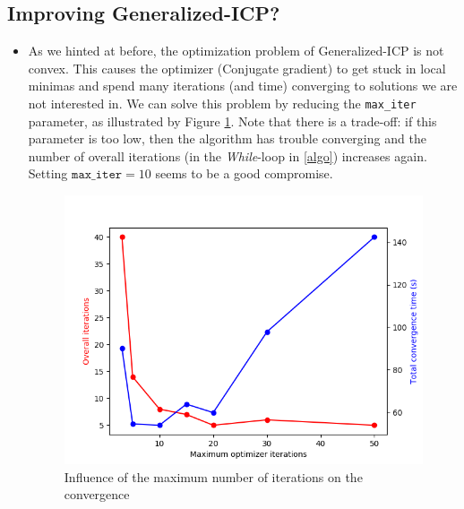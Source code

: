 \documentclass[11pt,letterpaper,leqno]{article}
\begin{document}
\subsection{Improving Generalized-ICP?}
\begin{itemize}
    \item As we hinted at before, the optimization problem of Generalized-ICP is not convex. This causes the optimizer (Conjugate gradient) to get stuck in local minimas and spend many iterations (and time) converging to solutions we are not interested in. We can solve this problem by reducing the \texttt{max\_iter} parameter, as illustrated by Figure \ref{fig:maxiter}. Note that there is a trade-off: if this parameter is too low, then the algorithm has trouble converging and the number of overall iterations (in the \textit{While}-loop in \autoref{algo}) increases again. Setting $\texttt{max\_iter}=10$ seems to be a good compromise.
    \begin{figure}[ht!]
        \centering
        \includegraphics[width=0.6\linewidth]{img/maxiter.png}
        \caption{Influence of the maximum number of iterations on the convergence}
        \label{fig:maxiter}
    \end{figure}


\end{itemize}
\end{document}
